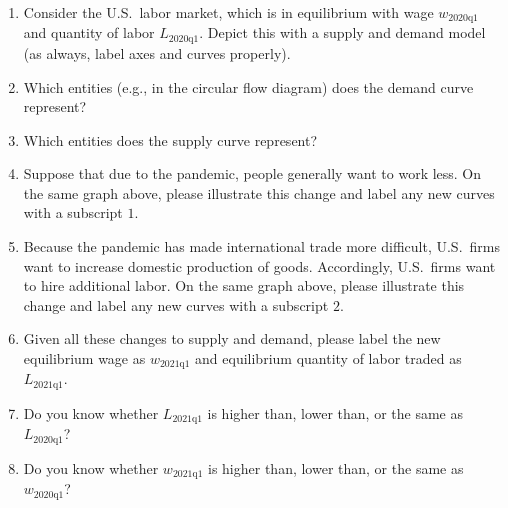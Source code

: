 \documentclass[
    letterpaper,paper=portrait,fleqn,
    DIV=16,fontsize=12pt,twoside=semi,
    parskip=full-,
    headings=standardclasses]
{scrartcl}
\begin{document}
\begin{enumerate}

\item Consider the U.S.~labor market, which is in equilibrium with wage $w_\text{2020q1}$ and quantity of labor $L_\text{2020q1}$. Depict this with a supply and demand model (as always, label axes and curves properly).

\begin{center}
\end{center}

\item Which entities (e.g., in the circular flow diagram) does the demand curve represent?

\vfill

\item Which entities does the supply curve represent?

\vfill

\item Suppose that due to the pandemic, people generally want to work less. On the same graph above, please illustrate this change and label any new curves with a subscript $1$.

\item Because the pandemic has made international trade more difficult, U.S.~firms want to increase domestic production of goods. Accordingly, U.S.~firms want to hire additional labor. On the same graph above, please illustrate this change and label any new curves with a subscript $2$.

\item Given all these changes to supply and demand, please label the new equilibrium wage as $w_\text{2021q1}$ and equilibrium quantity of labor traded as $L_\text{2021q1}$.

\item Do you know whether $L_\text{2021q1}$ is higher than, lower than, or the same as $L_\text{2020q1}$?

\vfill

\item Do you know whether $w_\text{2021q1}$ is higher than, lower than, or the same as $w_\text{2020q1}$?

\vfill

\end{enumerate}
\end{document}
